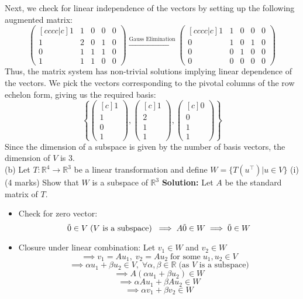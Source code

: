 \documentclass{article}
\begin{document}
Next, we check for linear independence of the vectors by setting up the following augmented matrix:
$$
\begin{pmatrix}[cccc|c]
    1 & 1 & 0 & 0 & 0 \\
    1 & 2 & 0 & 1 & 0 \\
    0 & 1 & 1 & 1 & 0 \\
    1 & 1 & 1 & 0 & 0
\end{pmatrix}
\xrightarrow{\text{Gauss Elimination}}
\begin{pmatrix}[cccc|c]
    1 & 1 & 0 & 0 & 0 \\
    0 & 1 & 0 & 1 & 0 \\
    0 & 0 & 1 & 0 & 0 \\
    0 & 0 & 0 & 0 & 0
\end{pmatrix}
$$
Thus, the matrix system has non-trivial solutions implying linear dependence of the vectors. We pick the vectors corresponding to the pivotal columns of the row echelon form, giving us the required basis:
$$\left\{ 
\begin{pmatrix}[c] 1 \\ 1 \\ 0 \\ 1 \end{pmatrix}, \begin{pmatrix}[c] 1 \\ 2 \\ 1 \\ 1 \end{pmatrix}, \begin{pmatrix}[c] 0 \\ 0 \\ 1 \\ 1 \end{pmatrix}\right\}$$
Since the dimension of a subspace is given by the number of basis vectors, the dimension of $V$ is 3.
\newline
\\ (b) Let $T : \mathbb{R}^4 \xrightarrow{} \mathbb{R}^3$ be a linear transformation and define $W = \{ T(u^\top) | u \in V \}$
\newline
(i) (4 marks) Show that $W$ is a subspace of $\mathbb{R}^3$
\newline
\textbf{Solution:}
Let $A$ be the standard matrix of $T$.
\begin{itemize}
    \item Check for zero vector:
    $$\Tilde{0} \in V \; \text{(} V \text{ is a subspace)} \; \implies A \Tilde{0} \in W \implies \Tilde{0} \in W$$
    \item Closure under linear combination:
    Let $v_1 \in W$ and $v_2 \in W$
    $$\implies v_1 = Au_1, \; v_2 = Au_2 \; \text{for some} \; u_1, u_2 \in V$$
    $$\implies \alpha u_1 + \beta u_2 \in V, \; \forall \alpha, \beta \in \mathbb{R} \; \text{(as } V \text{ is a subspace)}$$
    $$\implies A(\alpha u_1 + \beta u_2) \in W$$
    $$ \implies \alpha A u_1 + \beta A u_2 \in W$$
    $$ \implies \alpha v_1 + \beta v_2 \in W$$
\end{itemize}
\end{document}
